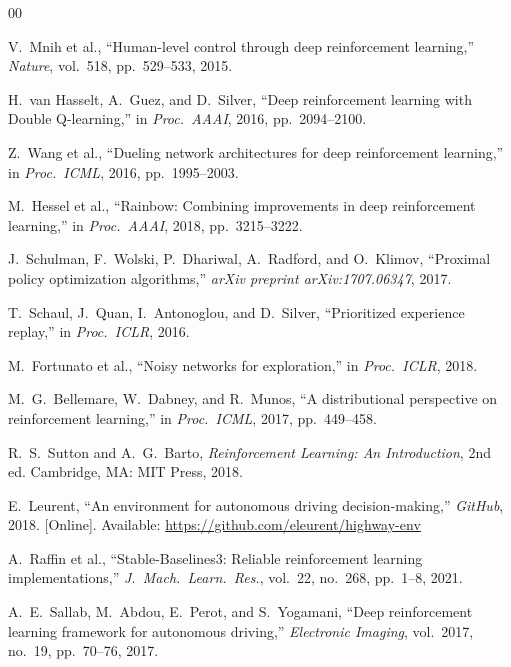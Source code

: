 \documentclass[conference]{IEEEtran}
\begin{document}
\begin{thebibliography}{00}

V.\ Mnih et al., ``Human-level control through deep reinforcement learning,''
\textit{Nature}, vol.\ 518, pp.\ 529--533, 2015.

H.\ van Hasselt, A.\ Guez, and D.\ Silver, ``Deep reinforcement learning with Double
Q-learning,'' in \textit{Proc.\ AAAI}, 2016, pp.\ 2094--2100.

Z.\ Wang et al., ``Dueling network architectures for deep reinforcement learning,''
in \textit{Proc.\ ICML}, 2016, pp.\ 1995--2003.

M.\ Hessel et al., ``Rainbow: Combining improvements in deep reinforcement learning,''
in \textit{Proc.\ AAAI}, 2018, pp.\ 3215--3222.

J.\ Schulman, F.\ Wolski, P.\ Dhariwal, A.\ Radford, and O.\ Klimov,
``Proximal policy optimization algorithms,''
\textit{arXiv preprint arXiv:1707.06347}, 2017.

T.\ Schaul, J.\ Quan, I.\ Antonoglou, and D.\ Silver,
``Prioritized experience replay,''
in \textit{Proc.\ ICLR}, 2016.

M.\ Fortunato et al., ``Noisy networks for exploration,''
in \textit{Proc.\ ICLR}, 2018.

M.\ G.\ Bellemare, W.\ Dabney, and R.\ Munos,
``A distributional perspective on reinforcement learning,''
in \textit{Proc.\ ICML}, 2017, pp.\ 449--458.

R.\ S.\ Sutton and A.\ G.\ Barto, \textit{Reinforcement Learning: An Introduction},
2nd ed. Cambridge, MA: MIT Press, 2018.

E.\ Leurent, ``An environment for autonomous driving decision-making,''
\textit{GitHub}, 2018. [Online]. Available: \url{https://github.com/eleurent/highway-env}

A.\ Raffin et al., ``Stable-Baselines3: Reliable reinforcement learning implementations,''
\textit{J.\ Mach.\ Learn.\ Res.}, vol.\ 22, no.\ 268, pp.\ 1--8, 2021.

A.\ E.\ Sallab, M.\ Abdou, E.\ Perot, and S.\ Yogamani,
``Deep reinforcement learning framework for autonomous driving,''
\textit{Electronic Imaging}, vol.\ 2017, no.\ 19, pp.\ 70--76, 2017.


\end{thebibliography}
\end{document}

